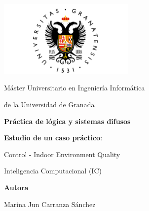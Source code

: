 \documentclass[12pt]{article}
\begin{document}
\begin{titlepage}
	    \centering
	\begin{minipage}{1\textwidth}
		\raisebox{-0.7\height}
		{\includegraphics[width=0.5\textwidth]{UGR-Logo}}
	\end{minipage}
	
	\vspace{1.5cm}
	
	{\Large Máster Universitario en Ingeniería Informática
		
		de la Universidad de Granada \par}
	
	\vspace{1.5cm}
	
	{\Huge \textbf{Práctica de lógica y sistemas difusos}
		
	\vspace{0.6cm}
	
	\textbf{Estudio de un caso práctico}:
			
	Control - Indoor Environment Quality
	 \par}
	
	\vspace{1.5cm}
	
	{\LARGE {Inteligencia Computacional (IC)} \par}
	
	\vspace{1.5cm}
	
	\vfill
	
	{\Large \textbf{Autora} \par}
	{\Large Marina Jun Carranza Sánchez \par}
	\vspace{0.5cm}
    
\end{titlepage}
\end{document}
